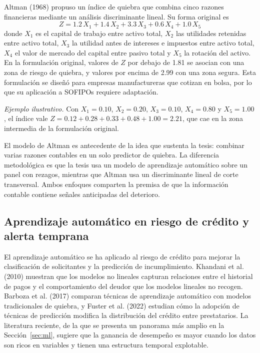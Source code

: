 Altman (1968) propuso un índice de quiebra que combina cinco razones financieras mediante un análisis discriminante lineal. Su forma original es
\begin{equation}
Z=1.2\,X_1+1.4\,X_2+3.3\,X_3+0.6\,X_4+1.0\,X_5
\label{eq:altman}
\end{equation}
donde $X_1$ es el capital de trabajo entre activo total, $X_2$ las utilidades retenidas entre activo total, $X_3$ la utilidad antes de intereses e impuestos entre activo total, $X_4$ el valor de mercado del capital entre pasivo total y $X_5$ la rotación del activo. En la formulación original, valores de $Z$ por debajo de 1.81 se asocian con una zona de riesgo de quiebra, y valores por encima de 2.99 con una zona segura. Esta formulación se diseñó para empresas manufactureras que cotizan en bolsa, por lo que su aplicación a SOFIPOs requiere adaptación. %

\textit{Ejemplo ilustrativo.} Con $X_1=0.10$, $X_2=0.20$, $X_3=0.10$, $X_4=0.80$ y $X_5=1.00$, el índice vale $Z=0.12+0.28+0.33+0.48+1.00=2.21$, que cae en la zona intermedia de la formulación original.

El modelo de Altman es antecedente de la idea que sustenta la tesis: combinar varias razones contables en un solo predictor de quiebra. La diferencia metodológica es que la tesis usa un modelo de aprendizaje automático sobre un panel con rezagos, mientras que Altman usa un discriminante lineal de corte transversal. Ambos enfoques comparten la premisa de que la información contable contiene señales anticipadas del deterioro.

\subsection{Aprendizaje automático en riesgo de crédito y alerta temprana}
El aprendizaje automático se ha aplicado al riesgo de crédito para mejorar la clasificación de solicitantes y la predicción de incumplimiento. Khandani et al. (2010) muestran que los modelos no lineales capturan relaciones entre el historial de pagos y el comportamiento del deudor que los modelos lineales no recogen. Barboza et al. (2017) comparan técnicas de aprendizaje automático con modelos tradicionales de quiebra, y Fuster et al. (2022) estudian cómo la adopción de técnicas de predicción modifica la distribución del crédito entre prestatarios. La literatura reciente, de la que se presenta un panorama más amplio en la Sección~\ref{sec:ml}, sugiere que la ganancia de desempeño es mayor cuando los datos son ricos en variables y tienen una estructura temporal explotable.

